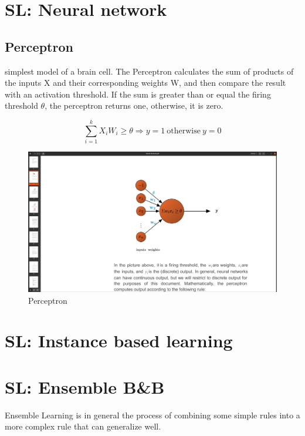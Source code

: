 \documentclass[12pt]{report}
\begin{document}
\section{SL: Neural network}


\subsection{Perceptron}

simplest model of a brain cell. The Perceptron calculates the sum of products of the inputs X and their corresponding weights W, and then compare the result with an activation threshold. If the sum is greater than or equal the firing threshold $\theta$, the perceptron returns one, otherwise, it is zero.

\begin{equation}
\sum_{i=1}^k X_i W_i \ge \theta  \Rightarrow y = 1 \: \text{otherwise} \: y = 0
\end{equation}

\begin{figure}[H]
	\centering
	\caption{Perceptron}
	\includegraphics[trim =20cm 15.0cm 10cm 8cm, clip, scale=0.2]{perceptron.png}
\end{figure}




\section{SL: Instance based learning}
\section{SL: Ensemble B\&B}

Ensemble Learning is in general the process of combining some simple rules into a more complex rule that can generalize well.
\end{document}
